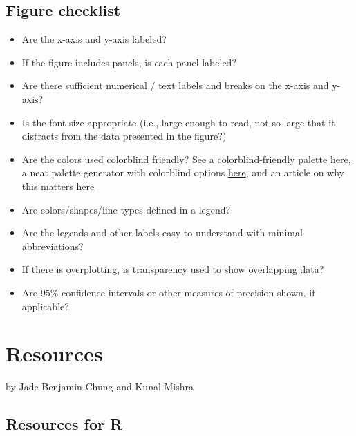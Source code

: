 \documentclass[
]{book}
\providecommand{\tightlist}{%
  \setlength{\itemsep}{0pt}\setlength{\parskip}{0pt}}
\begin{document}
\hypertarget{figure-checklist}{%
\section{Figure checklist}\label{figure-checklist}}

\begin{itemize}
\tightlist
\item
  Are the x-axis and y-axis labeled?
\item
  If the figure includes panels, is each panel labeled?
\item
  Are there sufficient numerical / text labels and breaks on the x-axis and y-axis?
\item
  Is the font size appropriate (i.e., large enough to read, not so large that it distracts from the data presented in the figure?)
\item
  Are the colors used colorblind friendly? See a colorblind-friendly palette \href{http://www.cookbook-r.com/Graphs/Colors_(ggplot2)/\#a-colorblind-friendly-palette}{here}, a neat palette generator with colorblind options \href{https://medialab.github.io/iwanthue/?utm_source=Nature+Briefing\&utm_campaign=2c68711076-briefing-dy-20211006\&utm_medium=email\&utm_term=0_c9dfd39373-2c68711076-44335685}{here}, and an article on why this matters \href{https://www.nature.com/articles/d41586-021-02696-z}{here}
\item
  Are colors/shapes/line types defined in a legend?
\item
  Are the legends and other labels easy to understand with minimal abbreviations?
\item
  If there is overplotting, is transparency used to show overlapping data?
\item
  Are 95\% confidence intervals or other measures of precision shown, if applicable?
\end{itemize}

\hypertarget{resources}{%
\chapter{Resources}\label{resources}}

by Jade Benjamin-Chung and Kunal Mishra

\hypertarget{resources-for-r}{%
\section{Resources for R}\label{resources-for-r}}
\end{document}

